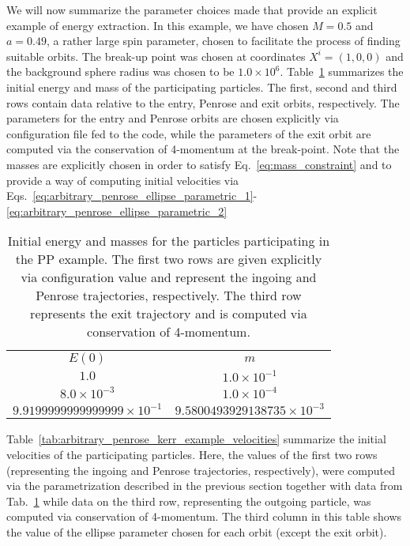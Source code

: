 We will now summarize the parameter choices made that provide an explicit example of energy extraction. In this example, we have chosen $M = 0.5$ and $a = 0.49$, a rather large spin parameter, chosen to facilitate the process of finding suitable orbits. The break-up point was chosen at coordinates $X^i = (1, 0, 0)$ and the background sphere radius was chosen to be $1.0\times 10^6$. Table~\ref{tab:arbitrary_penrose_kerr_example_energy_mass} summarizes the initial energy and mass of the participating particles. The first, second and third rows contain data relative to the entry, Penrose and exit orbits, respectively. The parameters for the entry and Penrose orbits are chosen explicitly via configuration file fed to the code, while the parameters of the exit orbit are computed via the conservation of 4-momentum at the break-point. Note that the masses are explicitly chosen in order to satisfy Eq.~\eqref{eq:mass_constraint} and to provide a way of computing initial velocities via Eqs.~\eqref{eq:arbitrary_penrose_ellipse_parametric_1}-\eqref{eq:arbitrary_penrose_ellipse_parametric_2}

\begin{table}[]
  \centering
  \begin{tabular}{cc}
    \hline\hline
    $E(0)$                              & $m$                                 \\
    $1.0$                               & $1.0 \times 10^{-1}$                \\
    $8.0 \times 10^{-3}$                & $1.0 \times 10^{-4}$                \\
    $9.9199999999999999 \times 10^{-1}$ & $9.5800493929138735 \times 10^{-3}$ \\ \hline\hline
  \end{tabular}
  \caption{Initial energy and masses for the particles participating in the PP example. The first two rows are given explicitly via configuration value and represent the ingoing and Penrose trajectories, respectively. The third row represents the exit trajectory and is computed via conservation of 4-momentum.}
  \label{tab:arbitrary_penrose_kerr_example_energy_mass}
\end{table}

Table~\ref{tab:arbitrary_penrose_kerr_example_velocities} summarize the initial velocities of the participating particles. Here, the values of the first two rows (representing the ingoing and Penrose trajectories, respectively), were computed via the parametrization described in the previous section together with data from Tab.~\ref{tab:arbitrary_penrose_kerr_example_energy_mass} while data on the third row, representing the outgoing particle, was computed via conservation of 4-momentum. The third column in this table shows the value of the ellipse parameter chosen for each orbit (except the exit orbit).

